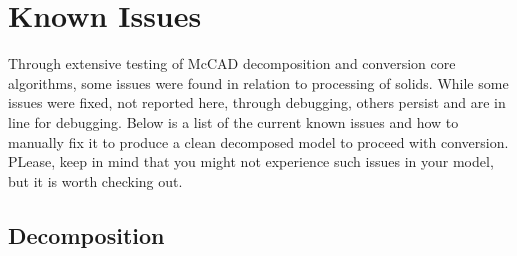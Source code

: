 \documentclass[12pt, a4paper, titlepage]{article}
\begin{document}
\section{Known Issues} \label{Known Issues}
Through extensive testing of McCAD decomposition and conversion core algorithms, some issues were found in relation to processing of solids. While some issues were fixed, not reported here, through debugging, others persist and are in line for debugging. Below is a list of the current known issues and how to manually fix it to produce a clean decomposed model to proceed with conversion. PLease, keep in mind that you might not experience such issues in your model, but it is worth checking out.
\subsection{Decomposition}
\end{document}

